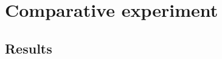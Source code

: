 \documentclass[fp,twocolumn]{jpsj3}
\begin{document}
\section{Comparative experiment} %
\subsection{Results} %

\begin{acknowledgment}



\end{acknowledgment}



\begin{thebibliography}{1}
\end{thebibliography}
\end{document}
